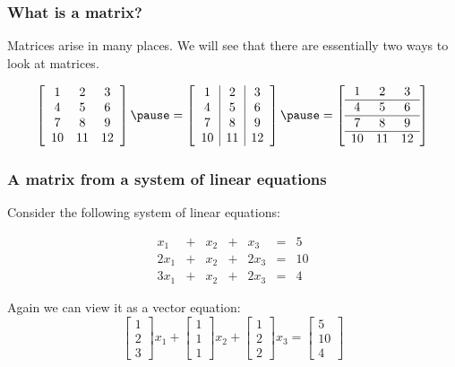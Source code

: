 

\begin{frame}
  \frametitle{What is a matrix?}

  Matrices arise in many places.  We will see that there are
  essentially two ways to look at matrices.
  
  \[
  \left[
    \begin{array}{ccc}
      1 & 2 & 3 \\
      4 & 5 & 6 \\
      7 & 8 & 9 \\
      10 & 11 & 12 \\
    \end{array}
    \right]
  \pause
  =
  \left[
    \begin{array}{c|c|c}
      1 & 2 & 3 \\
      4 & 5 & 6 \\
      7 & 8 & 9 \\
      10 & 11 & 12 \\
    \end{array}
    \right]
  \pause
  =
  \left[
    \begin{array}{ccc}
      1 & 2 & 3 \\
      \hline
      4 & 5 & 6 \\
      \hline
      7 & 8 & 9 \\
      \hline
      10 & 11 & 12 \\
    \end{array}
    \right]
  \]
\end{frame}

\begin{frame}
  \frametitle{A matrix from a system of linear equations}
  Consider the following system of linear equations:

  \[
  \begin{array}{ccccccr}
    x_1 &+& x_2 &+& x_3 &=& 5\\
    2x_1 &+& x_2 &+& 2x_3 &=& 10\\
    3x_1 &+& x_2 &+& 2x_3 &=& 4
  \end{array}
  \]
  \pause

  Again we can view it as a vector equation:
  \[
  \begin{bmatrix}
    1\\
    2\\
    3
  \end{bmatrix}
  x_1 +
  \begin{bmatrix}
    1\\
    1\\
    1
  \end{bmatrix}
  x_2 +
  \begin{bmatrix}
    1\\
    2\\
    2
  \end{bmatrix}
  x_3
  =
  \begin{bmatrix}
    5\\
    10\\
    4
  \end{bmatrix}
  \]
\end{frame}

